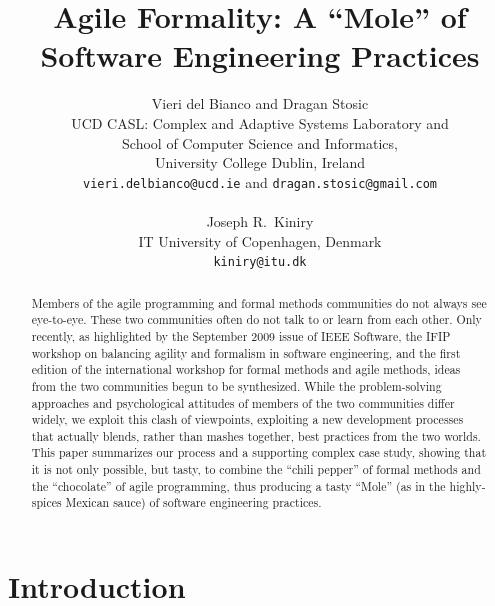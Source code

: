 \documentclass{article}
\begin{document}
\title{Agile Formality: A ``Mole'' of Software Engineering Practices}

\author{Vieri del Bianco and Dragan Stosic\\
  UCD CASL: Complex and Adaptive Systems Laboratory and\\
  School of Computer Science and Informatics,\\
  University College Dublin, Ireland\\
  \texttt{vieri.delbianco@ucd.ie} and \texttt{dragan.stosic@gmail.com}\\
  \\
  Joseph R.~Kiniry \\
  IT University of Copenhagen, Denmark\\
  \texttt{kiniry@itu.dk}
}

\maketitle

\begin{abstract}

Members of the agile programming and formal methods communities do not always see eye-to-eye.  
These two communities often do not talk to or learn from each other.  
Only recently, as highlighted by the September 2009 issue of IEEE Software, the IFIP workshop on balancing agility and formalism in software engineering, and the first edition of the international workshop for formal methods and agile methods, ideas from the two communities begun to be synthesized.  
While the problem-solving approaches and psychological attitudes of members of the two communities differ widely, we exploit this clash of viewpoints, exploiting a new development processes that actually blends, rather than mashes together, best practices from the two worlds.  
This paper summarizes our process and a supporting complex case study, showing that it is not only possible, but tasty, to combine the ``chili pepper'' of formal methods and the ``chocolate'' of agile programming, thus producing a tasty ``Mole'' (as in the highly-spices Mexican sauce) of software engineering practices.

\end{abstract}

\section{Introduction}
\label{sec:introduction}
\end{document}
